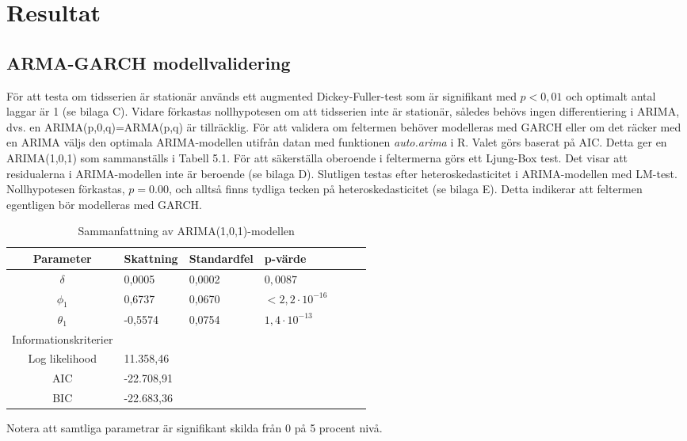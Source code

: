 \documentclass[11pt]{article}
\numberwithin{equation}{section}
\numberwithin{table}{section}
\numberwithin{figure}{section}
\begin{document}
\newpage
\section{Resultat}
\subsection{ARMA-GARCH modellvalidering}
För att testa om tidsserien är stationär används ett augmented Dickey-Fuller-test som är signifikant med $p<0,01$ och optimalt antal laggar är 1 (se bilaga C). Vidare förkastas nollhypotesen om att tidsserien inte är stationär, således behövs ingen differentiering i ARIMA, dvs. en ARIMA(p,0,q)=ARMA(p,q) är tillräcklig. För att validera om feltermen behöver modelleras med GARCH eller om det räcker med en ARIMA väljs den optimala ARIMA-modellen utifrån datan med funktionen \textit{auto.arima} i R. Valet görs baserat på AIC. Detta ger en ARIMA(1,0,1) som sammanställs i Tabell 5.1. För att säkerställa oberoende i feltermerna görs ett Ljung-Box test. Det visar att residualerna i ARIMA-modellen inte är beroende (se bilaga D). Slutligen testas efter heteroskedasticitet i ARIMA-modellen med LM-test. Nollhypotesen förkastas, $p=0.00$, och alltså finns tydliga tecken på heteroskedasticitet (se bilaga E). Detta indikerar att feltermen egentligen bör modelleras med GARCH. 

\begin{table}[H]
\caption{Sammanfattning av ARIMA(1,0,1)-modellen}
\begin{tabularx}{\textwidth}{c *{6}{Y}}
\toprule

Parameter  & Skattning & Standardfel & p-värde \\
\hline

$\delta$        & 0,0005  & 0,0002  & $0,0087$   \\
$\phi_1$        & 0,6737  & 0,0670  & $<2,2\cdot10^{-16}$   \\

$\theta_1$      & -0,5574 & 0,0754  &  $1,4\cdot10^{-13}$   \\
\midrule

Informationskriterier  & &  &  \\
\hline

Log likelihood        & 11.358,46 \\
AIC                   & -22.708,91 \\

BIC                   & -22.683,36 \\
\bottomrule
\end{tabularx}
\footnotesize{Notera att samtliga parametrar är signifikant skilda från 0 på 5 procent nivå.}
\end{table}
\end{document}
